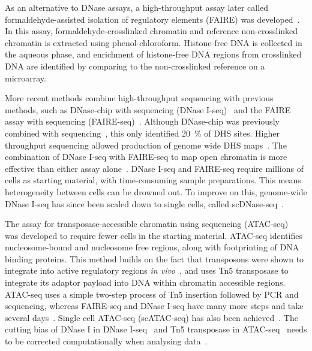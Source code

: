 As an alternative to DNase assays, a high\hyp{}throughput assay later called formaldehyde\hyp{}assisted isolation of regulatory elements (FAIRE) was developed~\autocite{nagyGenomewideDemarcationRNA2003}.
In this assay, formaldehyde\hyp{}crosslinked chromatin and reference non\hyp{}crosslinked chromatin is extracted using phenol\hyp{}chloroform.
Histone\hyp{}free DNA is collected in the aqueous phase, and enrichment of histone\hyp{}free DNA regions from crosslinked DNA are identified by comparing to the non\hyp{}crosslinked reference on a microarray.

More recent methods combine high\hyp{}throughput sequencing with previous methods, such as DNase-chip with sequencing (DNase I-seq)~\autocite{boyleHighResolutionMappingCharacterization2008} and the FAIRE assay with sequencing (FAIRE-seq)~\autocite{giresiFAIREFormaldehydeAssistedIsolation2007}.
Although DNase-chip was previously combined with sequencing~\autocite{crawfordGenomewideMappingDNase2006}, this only identified \SI{20}{\percent} of DHS sites. Higher throughput sequencing allowed production of genome wide DHS maps~\autocite{boyleHighResolutionMappingCharacterization2008}.
The combination of DNase I-seq with FAIRE-seq to map open chromatin is more effective than either assay alone~\autocite{songOpenChromatinDefined2011}.
DNase I-seq and FAIRE-seq require millions of cells as starting material, with time\hyp{}consuming sample preparations.
This means heterogeneity between cells can be drowned out.
To improve on this, genome\hyp{}wide DNase I-seq has since been scaled down to single cells, called scDNase-seq~\autocite{jinGenomewideDetectionDNase2015}.

The assay for transposase\hyp{}accessible chromatin using sequencing (ATAC\hyp{}seq)~\autocite{buenrostroTranspositionNativeChromatin2013} was developed to require fewer cells in the starting material.
ATAC\hyp{}seq identifies nucleosome\hyp{}bound and nucleosome free regions, along with footprinting of DNA binding proteins.
This method builds on the fact that transposons were shown to integrate into active regulatory regions \textit{in vivo}~\autocite{gangadharanDNATransposonHermes2010}, and uses Tn5 transposase to integrate its adaptor payload into DNA within chromatin accessible regions. ATAC\hyp{}seq uses a simple two\hyp{}step process of Tn5 insertion followed by PCR and sequencing, whereas FAIRE\hyp{}seq and DNase I\hyp{}seq have many more steps and take several days~\autocite{buenrostroTranspositionNativeChromatin2013}.
Single cell ATAC\hyp{}seq (scATAC\hyp{}seq) has also been achieved~\autocite{cusanovichMultiplexSinglecellProfiling2015,buenrostroSinglecellChromatinAccessibility2015}.
The cutting bias of DNase I in DNase I\hyp{}seq~\autocite{heRefinedDNaseseqProtocol2014} and Tn5 transposase in ATAC\hyp{}seq~\autocite{martinsUniversalCorrectionEnzymatic2018} needs to be corrected computationally when analysing data~\autocite{liuLongNoncodingRNA2019a}.

